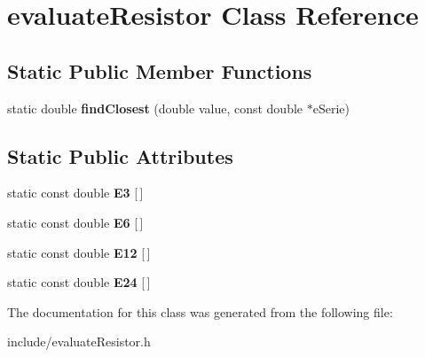 \hypertarget{classevaluateResistor}{}\section{evaluate\+Resistor Class Reference}
\label{classevaluateResistor}
\subsection*{Static Public Member Functions}
\begin{DoxyCompactItemize}
\item 
\mbox{\label{classevaluateResistor_ad5efe8cfc552898b35711e977c171f58}} 
static double {\bfseries find\+Closest} (double value, const double $\ast$e\+Serie)
\end{DoxyCompactItemize}
\subsection*{Static Public Attributes}
\begin{DoxyCompactItemize}
\item 
\mbox{\label{classevaluateResistor_abf56f7b4fdc9a2108e8ef109e2fa7a3d}} 
static const double {\bfseries E3} \mbox{[}$\,$\mbox{]}
\item 
\mbox{\label{classevaluateResistor_a2474a2ed91b61df96dbb85ab1999c667}} 
static const double {\bfseries E6} \mbox{[}$\,$\mbox{]}
\item 
\mbox{\label{classevaluateResistor_a41d601e814647941ad57814f6a5d77b7}} 
static const double {\bfseries E12} \mbox{[}$\,$\mbox{]}
\item 
\mbox{\label{classevaluateResistor_a6bfc5c45e0ca181e8a3eb37e44192c6d}} 
static const double {\bfseries E24} \mbox{[}$\,$\mbox{]}
\end{DoxyCompactItemize}


The documentation for this class was generated from the following file\+:\begin{DoxyCompactItemize}
\item 
include/evaluate\+Resistor.\+h\end{DoxyCompactItemize}
